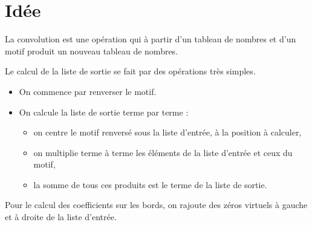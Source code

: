 \documentclass[11pt,class=report,crop=false]{standalone}
\begin{document}






\section{Idée}


La convolution est une opération qui à partir d'un tableau de nombres et d'un motif produit un nouveau tableau de nombres.



Le calcul de la liste de sortie se fait par des opérations très simples.
\begin{itemize}
  \item On commence par renverser le motif.
  
  \smallskip
  
  
  \item On calcule la liste de sortie terme par terme :
  \begin{itemize}
    \item on centre le motif renversé sous la liste d'entrée, à la position à calculer,
    \item on multiplie terme à terme les éléments de la liste d'entrée et ceux du motif,
    \item la somme de tous ces produits est le terme de la liste de sortie.
  \end{itemize}
\end{itemize}






Pour le calcul des coefficients sur les bords, on rajoute des zéros virtuels à gauche et à droite de la liste d'entrée.
\end{document}
